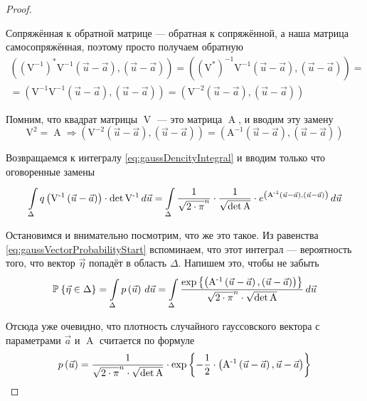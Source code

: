 \begin{proof}
\begin{enumerate}
      Сопряжённая к обратной матрице --- обратная к сопряжённой, а
      наша матрица самосопряжённая, поэтому просто получаем обратную
      \begin{align*}
          \left( \left( \operatorname{V^{-1}} \right)^*
            \operatorname{V^{-1}} \left( \vec{u} - \vec{a} \right),
            \left( \vec{u} - \vec{a} \right) \right)
          = \left( \left( \operatorname{V^*} \right)^{-1}
            \operatorname{V^{-1}} \left( \vec{u} - \vec{a} \right),
            \left( \vec{u} - \vec{a} \right) \right) = \\
          = \left( \operatorname{V^{-1}}
            \operatorname{V^{-1}} \left( \vec{u} - \vec{a} \right),
            \left( \vec{u} - \vec{a} \right) \right)
          = \left( \operatorname{V^{-2}} \left( \vec{u} - \vec{a} \right),
            \left( \vec{u} - \vec{a} \right) \right)
      \end{align*}

      Помним, что квадрат матрицы $\operatorname{V}$ --- это матрица
      $\operatorname{A}$, и вводим эту замену
      $$\operatorname{V^2} = \operatorname{A} \Rightarrow
          \left( \operatorname{V^{-2}} \left( \vec{u} - \vec{a} \right),
            \left( \vec{u} - \vec{a} \right) \right)
          = \left( \operatorname{A^{-1}} \left( \vec{u} - \vec{a} \right),
            \left( \vec{u} - \vec{a} \right) \right)$$
  \end{enumerate}

  Возвращаемся к интегралу \eqref{eq:gaussDencityIntegral} и вводим
  только что оговоренные замены
  $$\integrall{\Delta}{d\vec{u}}{ q\left( \operatorname{V^{-1}}
          \left( \vec{u} - \vec{a} \right) \right)
      \cdot \det{\operatorname{V^{-1}}}}
      = \integrall{\Delta}{d\vec{u}}{\frac{1}{\sqrt{2 \cdot \pi}^n}
      \cdot \frac{1}{\sqrt{\det{\operatorname{A}}}}
      \cdot e^{\left( \operatorname{A^{-1}}
        \left( \vec{u} - \vec{a} \right),
          \left( \vec{u} - \vec{a} \right) \right)}}$$

  Остановимся и внимательно посмотрим, что же это такое. Из равенства
  \eqref{eq:gaussVectorProbabilityStart} вспоминаем, что этот интеграл ---
  вероятность того, что вектор $\vec{\eta}$ попадёт в область $\Delta$.
  Напишем это, чтобы не забыть
  $$\Probability{\vec{\eta} \in \Delta}
      = \integrall{\Delta}{d\vec{u}}{\pdf{\vec{u}}}
      = \integrall{\Delta}{d\vec{u}}{
      \frac{\exp{\left\{\left( \operatorname{A^{-1}}
        \left( \vec{u} - \vec{a} \right),
          \left( \vec{u} - \vec{a} \right) \right) \right\}}}{
          \sqrt{2 \cdot \pi}^n \cdot \sqrt{\det{\operatorname{A}}}}}$$

  Отсюда уже очевидно, что плотность случайного гауссовского вектора с
  параметрами $\vec{a}$ и $\operatorname{A}$ считается по формуле
  $$\pdf{\vec{u}}
      = \frac{1}{\sqrt{2 \cdot \pi}^n \cdot \sqrt{\det{\operatorname{A}}}}
      \cdot \exp{\left\{ -\frac{1}{2} \cdot \left(
          \operatorname{A^{-1}} \left( \vec{u} - \vec{a} \right),
          \vec{u} - \vec{a} \right) \right\}}$$
\end{proof}

